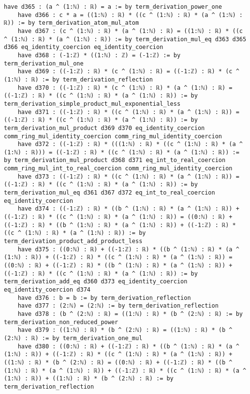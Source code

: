 \documentclass{article}
\begin{document}
\begin{tcolorbox}[colback=white!10, width=\linewidth]
\begin{lstlisting}[language=Lean4]
    have d365 : (a ^ (1:ℕ) : ℝ) = a := by term_derivation_power_one
    have d366 : c * a = ((1:ℕ) : ℝ) * ((c ^ (1:ℕ) : ℝ) * (a ^ (1:ℕ) : ℝ)) := by term_derivation_atom_mul_atom
    have d367 : (c ^ (1:ℕ) : ℝ) * (a ^ (1:ℕ) : ℝ) = ((1:ℕ) : ℝ) * ((c ^ (1:ℕ) : ℝ) * (a ^ (1:ℕ) : ℝ)) := by term_derivation_mul_eq d363 d365 d366 eq_identity_coercion eq_identity_coercion
    have d368 : (-1:ℤ) * ((1:ℕ) : ℤ) = (-1:ℤ) := by term_derivation_mul_one
    have d369 : ((-1:ℤ) : ℝ) * (c ^ (1:ℕ) : ℝ) = ((-1:ℤ) : ℝ) * (c ^ (1:ℕ) : ℝ) := by term_derivation_reflection
    have d370 : ((-1:ℤ) : ℝ) * (c ^ (1:ℕ) : ℝ) * (a ^ (1:ℕ) : ℝ) = ((-1:ℤ) : ℝ) * ((c ^ (1:ℕ) : ℝ) * (a ^ (1:ℕ) : ℝ)) := by term_derivation_simple_product_mul_exponential_less
    have d371 : ((-1:ℤ) : ℝ) * ((c ^ (1:ℕ) : ℝ) * (a ^ (1:ℕ) : ℝ)) = ((-1:ℤ) : ℝ) * ((c ^ (1:ℕ) : ℝ) * (a ^ (1:ℕ) : ℝ)) := by term_derivation_mul_product d369 d370 eq_identity_coercion comm_ring_mul_identity_coercion comm_ring_mul_identity_coercion
    have d372 : ((-1:ℤ) : ℝ) * (((1:ℕ) : ℝ) * ((c ^ (1:ℕ) : ℝ) * (a ^ (1:ℕ) : ℝ))) = ((-1:ℤ) : ℝ) * ((c ^ (1:ℕ) : ℝ) * (a ^ (1:ℕ) : ℝ)) := by term_derivation_mul_product d368 d371 eq_int_to_real_coercion comm_ring_mul_int_to_real_coercion comm_ring_mul_identity_coercion
    have d373 : ((-1:ℤ) : ℝ) * ((c ^ (1:ℕ) : ℝ) * (a ^ (1:ℕ) : ℝ)) = ((-1:ℤ) : ℝ) * ((c ^ (1:ℕ) : ℝ) * (a ^ (1:ℕ) : ℝ)) := by term_derivation_mul_eq d361 d367 d372 eq_int_to_real_coercion eq_identity_coercion
    have d374 : ((-1:ℤ) : ℝ) * ((b ^ (1:ℕ) : ℝ) * (a ^ (1:ℕ) : ℝ)) + ((-1:ℤ) : ℝ) * ((c ^ (1:ℕ) : ℝ) * (a ^ (1:ℕ) : ℝ)) = ((0:ℕ) : ℝ) + ((-1:ℤ) : ℝ) * ((b ^ (1:ℕ) : ℝ) * (a ^ (1:ℕ) : ℝ)) + ((-1:ℤ) : ℝ) * ((c ^ (1:ℕ) : ℝ) * (a ^ (1:ℕ) : ℝ)) := by term_derivation_product_add_product_less
    have d375 : ((0:ℕ) : ℝ) + ((-1:ℤ) : ℝ) * ((b ^ (1:ℕ) : ℝ) * (a ^ (1:ℕ) : ℝ)) + ((-1:ℤ) : ℝ) * ((c ^ (1:ℕ) : ℝ) * (a ^ (1:ℕ) : ℝ)) = ((0:ℕ) : ℝ) + ((-1:ℤ) : ℝ) * ((b ^ (1:ℕ) : ℝ) * (a ^ (1:ℕ) : ℝ)) + ((-1:ℤ) : ℝ) * ((c ^ (1:ℕ) : ℝ) * (a ^ (1:ℕ) : ℝ)) := by term_derivation_add_eq d360 d373 eq_identity_coercion eq_identity_coercion d374
    have d376 : b = b := by term_derivation_reflection
    have d377 : (2:ℕ) = (2:ℕ) := by term_derivation_reflection
    have d378 : (b ^ (2:ℕ) : ℝ) = ((1:ℕ) : ℝ) * (b ^ (2:ℕ) : ℝ) := by term_derivation_non_reduced_power
    have d379 : ((1:ℕ) : ℝ) * (b ^ (2:ℕ) : ℝ) = ((1:ℕ) : ℝ) * (b ^ (2:ℕ) : ℝ) := by term_derivation_one_mul
    have d380 : ((0:ℕ) : ℝ) + ((-1:ℤ) : ℝ) * ((b ^ (1:ℕ) : ℝ) * (a ^ (1:ℕ) : ℝ)) + ((-1:ℤ) : ℝ) * ((c ^ (1:ℕ) : ℝ) * (a ^ (1:ℕ) : ℝ)) + ((1:ℕ) : ℝ) * (b ^ (2:ℕ) : ℝ) = ((0:ℕ) : ℝ) + ((-1:ℤ) : ℝ) * ((b ^ (1:ℕ) : ℝ) * (a ^ (1:ℕ) : ℝ)) + ((-1:ℤ) : ℝ) * ((c ^ (1:ℕ) : ℝ) * (a ^ (1:ℕ) : ℝ)) + ((1:ℕ) : ℝ) * (b ^ (2:ℕ) : ℝ) := by term_derivation_reflection

\end{lstlisting}
\end{tcolorbox}
\end{document}
